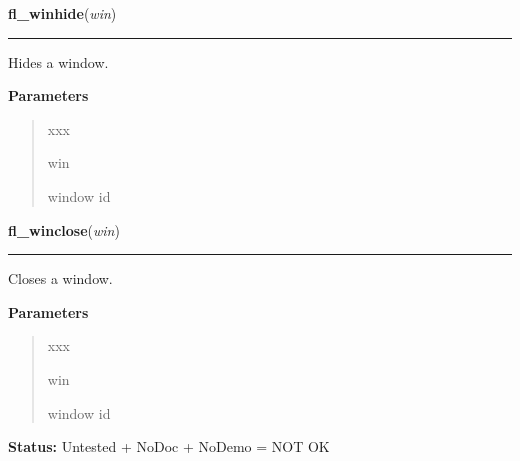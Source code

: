 \hspace{.8\funcindent}\begin{boxedminipage}{\funcwidth}

    \raggedright \textbf{fl\_winhide}(\textit{win})

    \vspace{-1.5ex}

    \rule{\textwidth}{0.5\fboxrule}
\setlength{\parskip}{2ex}
    Hides a window.

\setlength{\parskip}{1ex}
      \textbf{Parameters}
      \vspace{-1ex}

      \begin{quote}
        \begin{Ventry}{xxx}

          \item[win]

          window id

        \end{Ventry}

      \end{quote}

    \end{boxedminipage}

    \label{xformslib:library:fl_winclose}

    \vspace{0.5ex}

\hspace{.8\funcindent}\begin{boxedminipage}{\funcwidth}

    \raggedright \textbf{fl\_winclose}(\textit{win})

    \vspace{-1.5ex}

    \rule{\textwidth}{0.5\fboxrule}
\setlength{\parskip}{2ex}
    Closes a window.

\setlength{\parskip}{1ex}
      \textbf{Parameters}
      \vspace{-1ex}

      \begin{quote}
        \begin{Ventry}{xxx}

          \item[win]

          window id

        \end{Ventry}

      \end{quote}

\textbf{Status:} Untested + NoDoc + NoDemo = NOT OK



    \end{boxedminipage}

